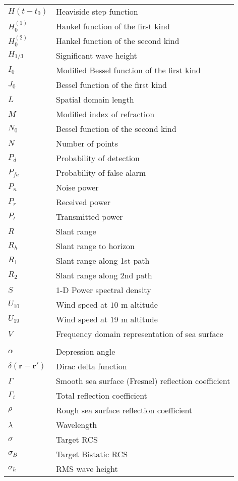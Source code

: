 \begin{supertabular}{ll}
$H(t-t_0)$ & Heaviside step function \\
$H_0^{(1)}$ & Hankel function of the first kind \\
$H_0^{(2)}$ & Hankel function of the second kind \\
$H_{1/3}$ & Significant wave height \\
$I_0$ & Modified Bessel function of the first kind \\
$J_0$ & Bessel function of the first kind \\
$L$ & Spatial domain length \\
$M$ & Modified index of refraction \\
$N_0$ & Bessel function of the second kind \\
$N$ & Number of points \\
$P_d$ & Probability of detection \\
$P_{fa}$ & Probability of false alarm \\
$P_n$ & Noise power\\
$P_r$ & Received power \\
$P_t$ & Transmitted power \\
$R$ & Slant range \\
$R_h$ & Slant range to horizon \\
$R_1$ & Slant range along 1st path \\
$R_2$ & Slant range along 2nd path \\
$S$ & 1-D Power spectral density \\
$U_{10}$ & Wind speed at $10$ m altitude \\
$U_{19}$ & Wind speed at $19$ m altitude \\
$V$ & Frequency domain representation of sea surface\\
\\
$\alpha$ & Depression angle \\
$\delta\left(\mathbf{r}-\mathbf{r}' \right)$ & Dirac delta function \\
$\Gamma$ & Smooth sea surface (Fresnel) reflection coefficient \\
$\Gamma_t$ & Total reflection coefficient \\
$\rho$ & Rough sea surface reflection coefficient \\
$\lambda$ & Wavelength \\
$\sigma$ & Target RCS\\
$\sigma_B$ & Target Bistatic RCS \\
$\sigma_h$ & RMS wave height \\

\end{supertabular}
